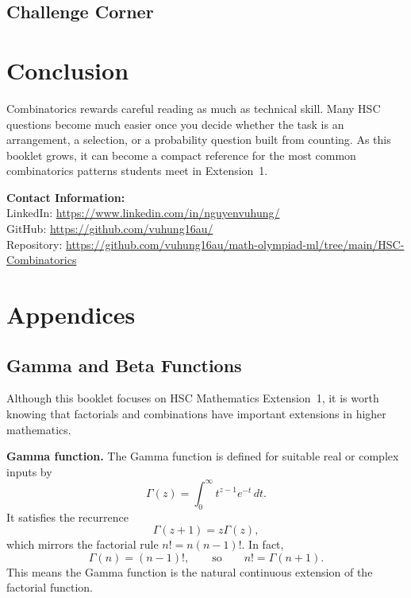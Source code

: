 \documentclass[12pt]{article}
\begin{document}
\subsection{Challenge Corner}


\section{Conclusion}

Combinatorics rewards careful reading as much as technical skill. Many HSC questions become much easier once you decide whether the task is an arrangement, a selection, or a probability question built from counting. As this booklet grows, it can become a compact reference for the most common combinatorics patterns students meet in Extension~1.

\vspace{2em}
\noindent\textbf{Contact Information:}\\[0.5em]
LinkedIn: \href{https://www.linkedin.com/in/nguyenvuhung/}{https://www.linkedin.com/in/nguyenvuhung/}\\[0.3em]
GitHub: \href{https://github.com/vuhung16au/}{https://github.com/vuhung16au/}\\[0.3em]
Repository: \href{https://github.com/vuhung16au/math-olympiad-ml/tree/main/HSC-Combinatorics}{https://github.com/vuhung16au/math-olympiad-ml/tree/main/HSC-Combinatorics}

\newpage
\appendix
\section{Appendices}

\subsection{Gamma and Beta Functions}
Although this booklet focuses on HSC Mathematics Extension~1, it is worth knowing that factorials and combinations have important extensions in higher mathematics.

\textbf{Gamma function.} The Gamma function is defined for suitable real or complex inputs by
\[
\Gamma(z)=\int_0^\infty t^{z-1}e^{-t}\,dt.
\]
It satisfies the recurrence
\[
\Gamma(z+1)=z\Gamma(z),
\]
which mirrors the factorial rule $n!=n(n-1)!$. In fact,
\[
\Gamma(n)=(n-1)!,
\qquad\text{so}\qquad
n!=\Gamma(n+1).
\]
This means the Gamma function is the natural continuous extension of the factorial function.
\end{document}
